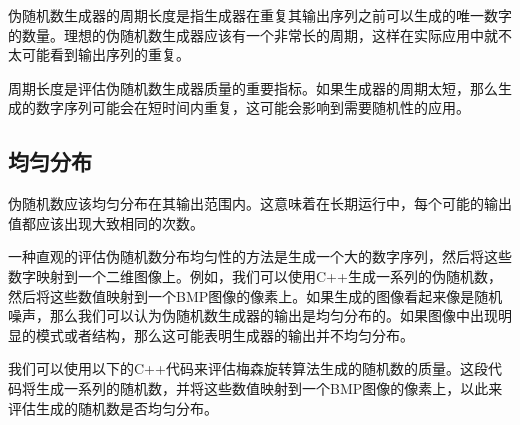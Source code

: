 \documentclass{ctexart}
\begin{document}
伪随机数生成器的周期长度是指生成器在重复其输出序列之前可以生成的唯一数字的数量。理想的伪随机数生成器应该有一个非常长的周期，这样在实际应用中就不太可能看到输出序列的重复\cite{knuth1981art}。

周期长度是评估伪随机数生成器质量的重要指标。如果生成器的周期太短，那么生成的数字序列可能会在短时间内重复，这可能会影响到需要随机性的应用。

\subsection{均匀分布}

伪随机数应该均匀分布在其输出范围内。这意味着在长期运行中，每个可能的输出值都应该出现大致相同的次数\cite{knuth1981art}。

一种直观的评估伪随机数分布均匀性的方法是生成一个大的数字序列，然后将这些数字映射到一个二维图像上。例如，我们可以使用C++生成一系列的伪随机数，然后将这些数值映射到一个BMP图像的像素上。如果生成的图像看起来像是随机噪声，那么我们可以认为伪随机数生成器的输出是均匀分布的。如果图像中出现明显的模式或者结构，那么这可能表明生成器的输出并不均匀分布。

我们可以使用以下的C++代码来评估梅森旋转算法生成的随机数的质量。这段代码将生成一系列的随机数，并将这些数值映射到一个BMP图像的像素上，以此来评估生成的随机数是否均匀分布。
\end{document}
